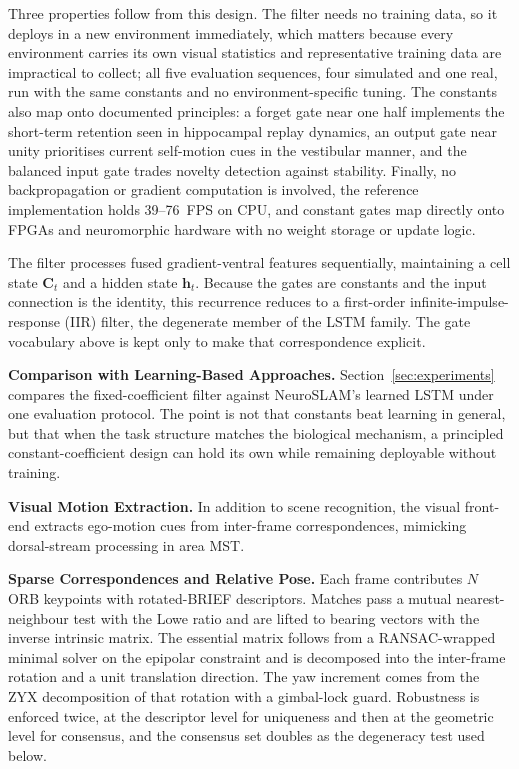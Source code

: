 Three properties follow from this design. The filter needs no training data, so it deploys in a new environment immediately, which matters because every environment carries its own visual statistics and representative training data are impractical to collect; all five evaluation sequences, four simulated and one real, run with the same constants and no environment-specific tuning. The constants also map onto documented principles: a forget gate near one half implements the short-term retention seen in hippocampal replay dynamics, an output gate near unity prioritises current self-motion cues in the vestibular manner, and the balanced input gate trades novelty detection against stability. Finally, no backpropagation or gradient computation is involved, the reference implementation holds 39--76~FPS on CPU, and constant gates map directly onto FPGAs and neuromorphic hardware with no weight storage or update logic.

The filter processes fused gradient-ventral features sequentially, maintaining a cell state $\mathbf{C}_t$ and a hidden state $\mathbf{h}_t$. Because the gates are constants and the input connection is the identity, this recurrence reduces to a first-order infinite-impulse-response (IIR) filter, the degenerate member of the LSTM family. The gate vocabulary above is kept only to make that correspondence explicit.

\textbf{Comparison with Learning-Based Approaches.} Section~\ref{sec:experiments} compares the fixed-coefficient filter against NeuroSLAM's learned LSTM under one evaluation protocol. The point is not that constants beat learning in general, but that when the task structure matches the biological mechanism, a principled constant-coefficient design can hold its own while remaining deployable without training.

\textbf{Visual Motion Extraction.} In addition to scene recognition, the visual front-end extracts ego-motion cues from inter-frame correspondences, mimicking dorsal-stream processing in area MST.

\textbf{Sparse Correspondences and Relative Pose.} Each frame contributes $N$ ORB keypoints with rotated-BRIEF descriptors. Matches pass a mutual nearest-neighbour test with the Lowe ratio and are lifted to bearing vectors with the inverse intrinsic matrix. The essential matrix follows from a RANSAC-wrapped minimal solver on the epipolar constraint and is decomposed into the inter-frame rotation and a unit translation direction. The yaw increment comes from the ZYX decomposition of that rotation with a gimbal-lock guard. Robustness is enforced twice, at the descriptor level for uniqueness and then at the geometric level for consensus, and the consensus set doubles as the degeneracy test used below.

